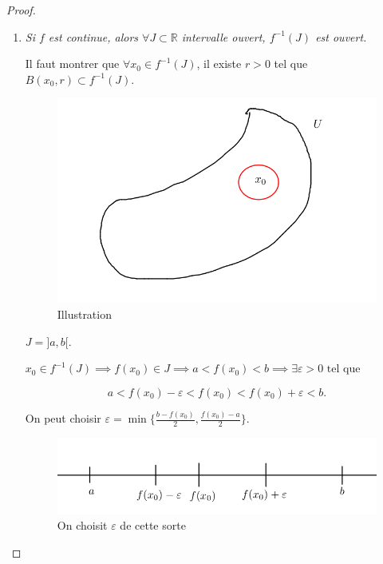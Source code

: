 \documentclass[french]{article}
\theoremstyle{definition}
\newcommand{\lesss}{<}
\newcommand{\less}{\lesss}
\newcommand{\biggg}{>}
\newcommand{\bg}{\biggg}
\begin{document}
\begin{proof}
  \begin{enumerate}
    \item \emph{Si $f$ est continue, alors $ \forall J \subset \mathbb{R}$ intervalle ouvert, $f ^{-1} (J)$ est ouvert.}

    Il faut montrer que $\forall x_0 \in f ^{-1} (J)$, il existe $r \bg 0$ tel que $B(x_0, r) \subset f ^{-1} (J)$.

    \begin{figure}[h!]
      \centering
      \includegraphics[scale=0.3]{figures/recip_ouvert.png}
      \caption{Illustration}
      \label{}
    \end{figure}

    $J = ]a,b[$.

    $x_0 \in f ^{-1} (J) \implies f(x_0) \in J \implies a \less f(x_0) \less b \implies \exists \varepsilon  \bg 0 \text{ tel que } $

    $$ a \less f(x_0) - \varepsilon \less f(x_0) \less f(x_0) + \varepsilon \less b.$$

    On peut choisir $\varepsilon = \min \{ \frac{b-f(x_0)}{2}, \frac{f(x_0)-a}{2} \} $.

    \begin{figure}[h!]
      \centering
      \includegraphics[scale=0.3]{figures/demo_prop_1.png}
      \caption{On choisit $\varepsilon $ de cette sorte}
      \label{}
    \end{figure}


\end{enumerate}
\end{proof}
\end{document}
